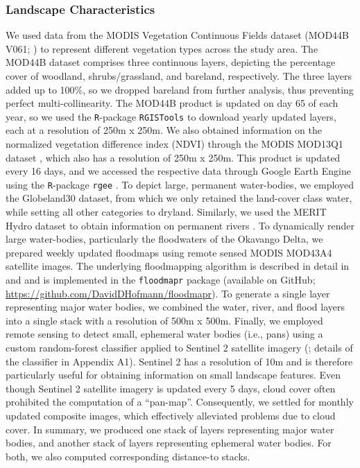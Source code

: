 \documentclass[abstract=on,10pt,a4paper,bibliography=totocnumbered]{article}
\begin{document}
\subsubsection{Landscape Characteristics}

We used data from the MODIS Vegetation Continuous Fields dataset (MOD44B V061;
\citealp{DiMiceli.2022}) to represent different vegetation types across the
study area. The MOD44B dataset comprises three continuous layers, depicting the
percentage cover of woodland, shrubs/grassland, and bareland, respectively. The
three layers added up to 100\%, so we dropped bareland from further analysis,
thus preventing perfect multi-collinearity. The MOD44B product is updated on day
65 of each year, so we used the \texttt{R}-package \texttt{RGISTools}
\citep{Perez-Goya.2020} to download yearly updated layers, each at a resolution
of 250m x 250m. We also obtained information on the normalized vegetation
difference index (NDVI) through the MODIS MOD13Q1 dataset \citep{Didan.2015},
which also has a resolution of 250m x 250m. This product is updated every 16
days, and we accessed the respective data through Google Earth Engine
\citep{Gorelick.2017} using the \texttt{R}-package \texttt{rgee}
\citep{Aybar.2024}. To depict large, permanent water-bodies, we employed the
Globeland30 dataset, from which we only retained the land-cover class water,
while setting all other categories to dryland. Similarly, we used the MERIT
Hydro dataset to obtain information on permanent rivers \citep{Yamazaki.2019}.
To dynamically render large water-bodies, particularly the floodwaters of the
Okavango Delta, we prepared weekly updated floodmaps using remote sensed MODIS
MOD43A4 satellite images. The underlying floodmapping algorithm is described in
detail in \citet{Wolski.2017} and \citet{Hofmann.2021} and is implemented in the
\texttt{floodmapr} package (available on GitHub;
\url{https://github.com/DavidDHofmann/floodmapr}). To generate a single layer
representing major water bodies, we combined the water, river, and flood layers
into a single stack with a resolution of 500m x 500m. Finally, we employed
remote sensing to detect small, ephemeral water bodies (i.e., pans) using a
custom random-forest classifier applied to Sentinel 2 satellite imagery
(\citealp{EuropeanSpaceAgency.2018}; details of the classifier in Appendix A1).
Sentinel 2 has a resolution of 10m and is therefore particularly useful for
obtaining information on small landscape features. Even though Sentinel 2
satellite imagery is updated every 5 days, cloud cover often prohibited the
computation of a ``pan-map''. Consequently, we settled for monthly updated
composite images, which effectively alleviated problems due to cloud cover. In
summary, we produced one stack of layers representing major water bodies, and
another stack of layers representing ephemeral water bodies. For both, we also
computed corresponding distance-to stacks.
\end{document}
